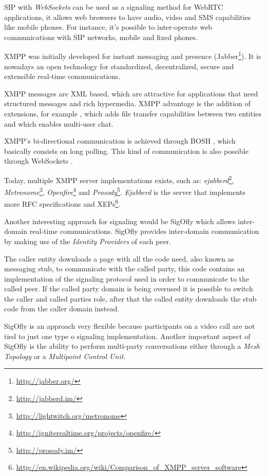   \ac{SIP} with \emph{WebSockets} can be used as a signaling method for \ac{WebRTC} applications, it allows web browsers to have audio, video and \ac{SMS} capabilities like mobile phones. For instance, it's possible to inter-operate web communications with \ac{SIP} networks, mobile and fixed phones.

  \ac{XMPP} was initially developed for instant messaging and presence (Jabber\footnote{\url{http://jabber.org/}}). It is nowadays an open technology for standardized, decentralized, secure and extensible real-time communications. 

  \ac{XMPP} messages are \ac{XML} based, which are attractive for applications that need structured messages and rich hypermedia. \ac{XMPP} advantage is the addition of extensions, for example \cite{xep0096}, which adds file transfer capabilities between two entities and \cite{xep0045} which enables multi-user chat.

  \ac{XMPP}'s bi-directional communication is achieved through \ac{BOSH} \cite{xep0206}, which basically consists on long polling. This kind of communication is also possible through WebSockets \cite{rfc7395}.

  Today, multiple XMPP server implementations exists, such as: \emph{ejabberd}\footnote{\url{http://jabberd.im/}}, \emph{Metronome}\footnote{\url{http://lightwitch.org/metronome}}, \emph{Openfire}\footnote{\url{http://igniterealtime.org/projects/openfire/}} and \emph{Prosody}\footnote{\url{http://prosody.im/}}. \emph{Ejabberd} is the server that implements more \ac{RFC} specifications and \ac{XEP}s\footnote{\url{http://en.wikipedia.org/wiki/Comparison_of_XMPP_server_software}}.

  Another interesting approach for signaling would be \ac{SigOfly} \cite{sigofly} which allows inter-domain real-time communications. \ac{SigOfly} provides inter-domain communication by making use of the \emph{Identity Providers} of each peer. 

  The caller entity downloads a page with all the code need, also known as messaging stub, to communicate with the called party, this code contains an implementation of the signaling protocol used in order to communicate to the called peer. If the called party domain is being overused it is possible to switch the caller and called parties role, after that the called entity downloads the stub code from the caller domain instead.

  \ac{SigOfly} is an approach very flexible because participants on a video call are not tied to just one type o signaling implementation. Another important aspect of  \ac{SigOfly} is the ability to perform multi-party conversations either through a \emph{Mesh Topology} or a \emph{Multipoint Control Unit}.


